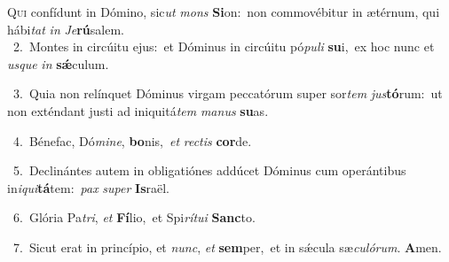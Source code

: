 \lettrine{\initial\textcolor{\initialcolor}{Q}}{ui} confídunt in Dómino, sic\textit{ut} \textit{mons} \textbf{Si}\-on:~\star non commovébitur in ætérnum, qui hábi\textit{tat} \textit{in} \textit{Je}\-\textbf{rú}salem.\\
{\numbfont\textcolor{\numbcolor}{~2.}}~Montes in circúitu ejus:~\dagger et Dóminus in circúitu pó\-\textit{pu}\-\textit{li} \textbf{su}\-i,~\star ex hoc nunc et \textit{us}\-\textit{que} \textit{in} \textbf{sǽ}\-culum.\par
{\numbfont\textcolor{\numbcolor}{~3.}}~Quia non relínquet Dóminus virgam peccatórum super sor\textit{tem} \textit{jus}\-\textbf{tó}rum:~\star ut non exténdant justi ad iniquitá\textit{tem} \textit{ma}\-\textit{nus} \textbf{su}\-as.\par
{\numbfont\textcolor{\numbcolor}{~4.}}~Bénefac, Dó\-\textit{mi}\-\textit{ne}, \textbf{bo}\-nis,~\star \textit{et} \textit{rec}\-\textit{tis} \textbf{cor}\-de.\par
{\numbfont\textcolor{\numbcolor}{~5.}}~Declinántes autem in obligatiónes addúcet Dóminus cum operántibus in\-\textit{i}\-\textit{qui}\textbf{tá}tem:~\star \textit{pax} \textit{su}\-\textit{per} \textbf{Is}\-raël.\par
{\numbfont\textcolor{\numbcolor}{~6.}}~Glória Pa\-\textit{tri}\-, \textit{et} \textbf{Fí}\-lio,~\star et Spi\-\textit{rí}\-\textit{tu}\textit{i} \textbf{Sanc}\-to.\par
{\numbfont\textcolor{\numbcolor}{~7.}}~Sicut erat in princípio, et \textit{nunc}\-, \textit{et} \textbf{sem}\-per,~\star et in sǽcula sæ\-\textit{cu}\-\textit{ló}\textit{rum}. \textbf{A}\-men.\par
